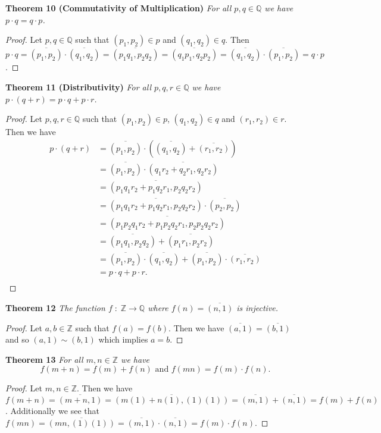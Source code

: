\documentclass{article}
\begin{document}
\begin{flushleft}
\textbf{Theorem 10 (Commutativity of Multiplication)}
\textsl{For all $p,q \in \mathbb{Q}$ we have $p \cdot q = q \cdot p$.}
\begin{proof}
Let $p,q \in \mathbb{Q}$ such that $(p_1,p_2) \in p$ and $(q_1,q_2) \in q$. Then $p \cdot q = \overline{(p_1,p_2)} \cdot \overline{(q_1,q_2)} = \overline{(p_1q_1,p_2q_2)} = \overline{(q_1p_1,q_2p_2)} = \overline{(q_1,q_2)} \cdot \overline{(p_1,p_2)} = q \cdot p$.
\end{proof}

\textbf{Theorem 11 (Distributivity)}
\textsl{For all $p,q,r \in \mathbb{Q}$ we have $p \cdot (q+r)=p \cdot q + p \cdot r$.}
\begin{proof}
Let $p,q,r \in \mathbb{Q}$ such that $(p_1,p_2) \in p$, $(q_1,q_2) \in q$ and $(r_1,r_2) \in r$. Then we have
\begin{align*}
p \cdot (q+r) &= \overline{(p_1,p_2)} \cdot \left(\overline{(q_1,q_2)} + \overline{(r_1,r_2)}\right) \\
			   &= \overline{(p_1,p_2)} \cdot \overline{(q_1r_2+q_2r_1,q_2r_2)}\\
			   &= \overline{(p_1q_1r_2+p_1q_2r_1,p_2q_2r_2)} \\
			   &= \overline{(p_1q_1r_2+p_1q_2r_1,p_2q_2r_2)} \cdot \overline{(p_2,p_2)} \\
			   &= \overline{(p_1p_2q_1r_2+p_1p_2q_2r_1,p_2p_2q_2r_2)} \\
			   &= \overline{(p_1q_1,p_2q_2)} + \overline{(p_1r_1,p_2r_2)} \\
			   &= \overline{(p_1,p_2)} \cdot \overline{(q_1,q_2)} + \overline{(p_1,p_2)} \cdot \overline{(r_1,r_2)} \\
			   &= p \cdot q + p \cdot r. \\
\end{align*}
\end{proof}

\textbf{Theorem 12}
\textsl{The function $f\; : \; \mathbb{Z} \rightarrow \mathbb{Q}$ where $f(n)=\overline{(n,1)}$ is injective.}
\begin{proof}
Let $a,b \in \mathbb{Z}$ such that $f(a)=f(b)$. Then we have $\overline{(a,1)}=\overline{(b,1)}$ and so $(a,1) \sim (b,1)$ which implies $a=b$.
\end{proof}

\textbf{Theorem 13}
\textsl{For all $m,n \in \mathbb{Z}$ we have
\[
f(m+n)=f(m)+f(n) \text{ and } f(mn)=f(m) \cdot f(n).
\]}
\begin{proof}
Let $m,n \in \mathbb{Z}$. Then we have $f(m+n)=\overline{(m+n,1)}=\overline{(m(1)+n(1),(1)(1))}=\overline{(m,1)}+\overline{(n,1)}=f(m)+f(n)$. Additionally we see that $f(mn)=\overline{(mn,(1)(1))}=\overline{(m,1)} \cdot \overline{(n,1)}=f(m) \cdot f(n)$.
\end{proof}


\end{flushleft}
\end{document}
